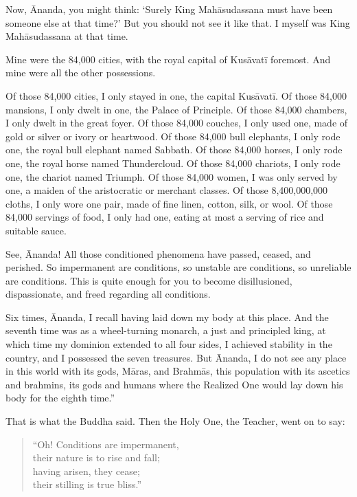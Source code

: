 \documentclass[12pt,openany]{book}%
\begin{document}
Now, Ānanda, you might think: ‘Surely King \textsanskrit{Mahāsudassana} must have been someone else at that time?’ But you should not see it like that. I myself was King \textsanskrit{Mahāsudassana} at that time. 

Mine were the 84,000 cities, with the royal capital of \textsanskrit{Kusāvatī} foremost. And mine were all the other possessions. 

Of those 84,000 cities, I only stayed in one, the capital \textsanskrit{Kusāvatī}. Of those 84,000 mansions, I only dwelt in one, the Palace of Principle. Of those 84,000 chambers, I only dwelt in the great foyer. Of those 84,000 couches, I only used one, made of gold or silver or ivory or heartwood. Of those 84,000 bull elephants, I only rode one, the royal bull elephant named Sabbath. Of those 84,000 horses, I only rode one, the royal horse named Thundercloud. Of those 84,000 chariots, I only rode one, the chariot named Triumph. Of those 84,000 women, I was only served by one, a maiden of the aristocratic or merchant classes. Of those 8,400,000,000 cloths, I only wore one pair, made of fine linen, cotton, silk, or wool. Of those 84,000 servings of food, I only had one, eating at most a serving of rice and suitable sauce. 

See, Ānanda! All those conditioned phenomena have passed, ceased, and perished. So impermanent are conditions, so unstable are conditions, so unreliable are conditions. This is quite enough for you to become disillusioned, dispassionate, and freed regarding all conditions. 

Six times, Ānanda, I recall having laid down my body at this place. And the seventh time was as a wheel-turning monarch, a just and principled king, at which time my dominion extended to all four sides, I achieved stability in the country, and I possessed the seven treasures. But Ānanda, I do not see any place in this world with its gods, \textsanskrit{Māras}, and \textsanskrit{Brahmās}, this population with its ascetics and brahmins, its gods and humans where the Realized One would lay down his body for the eighth time.” 

That is what the Buddha said. Then the Holy One, the Teacher, went on to say: 

\begin{verse}%
“Oh! Conditions are impermanent, \\
their nature is to rise and fall; \\
having arisen, they cease; \\
their stilling is true bliss.” 

%
\end{verse}
\end{document}
